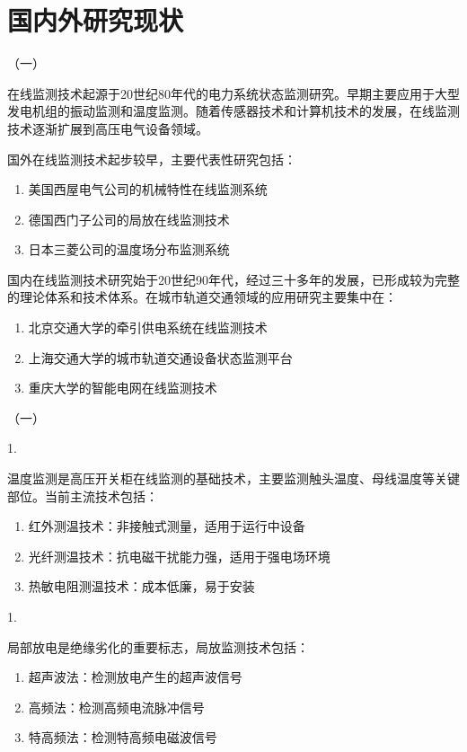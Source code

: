 \section{国内外研究现状}

（一）

在线监测技术起源于20世纪80年代的电力系统状态监测研究。早期主要应用于大型发电机组的振动监测和温度监测。随着传感器技术和计算机技术的发展，在线监测技术逐渐扩展到高压电气设备领域。

国外在线监测技术起步较早，主要代表性研究包括：
\begin{enumerate}
    \item 美国西屋电气公司的机械特性在线监测系统
    \item 德国西门子公司的局放在线监测技术
    \item 日本三菱公司的温度场分布监测系统
\end{enumerate}

国内在线监测技术研究始于20世纪90年代，经过三十多年的发展，已形成较为完整的理论体系和技术体系。在城市轨道交通领域的应用研究主要集中在：
\begin{enumerate}
    \item 北京交通大学的牵引供电系统在线监测技术
    \item 上海交通大学的城市轨道交通设备状态监测平台
    \item 重庆大学的智能电网在线监测技术
\end{enumerate}

（一）

1.

温度监测是高压开关柜在线监测的基础技术，主要监测触头温度、母线温度等关键部位。当前主流技术包括：
\begin{enumerate}
    \item 红外测温技术：非接触式测量，适用于运行中设备
    \item 光纤测温技术：抗电磁干扰能力强，适用于强电场环境
    \item 热敏电阻测温技术：成本低廉，易于安装
\end{enumerate}

1.

局部放电是绝缘劣化的重要标志，局放监测技术包括：
\begin{enumerate}
    \item 超声波法：检测放电产生的超声波信号
    \item 高频法：检测高频电流脉冲信号
    \item 特高频法：检测特高频电磁波信号
\end{enumerate}

